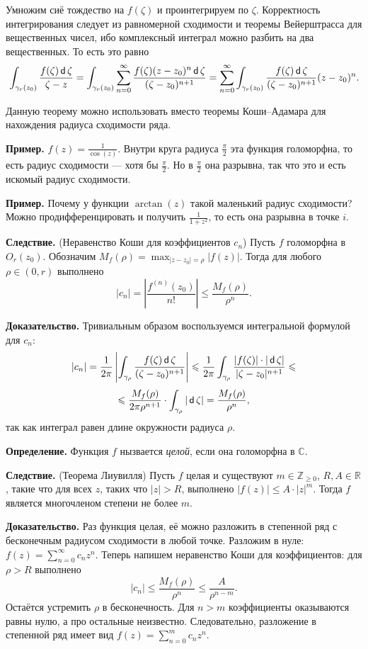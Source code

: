 Умножим сиё тождество на $f(\zeta)$ и проинтегрируем по $\zeta$.
Корректность интегрирования следует из равномерной сходимости и теоремы Вейерштрасса для вещественных чисел, ибо комплексный интеграл можно разбить на два вещественных.
То есть это равно
\[
    \int_{\gamma_r(z_0)} \frac{f(\zeta) \operatorname{\mathsf d} \zeta}{\zeta - z} = \int_{\gamma_r(z_0)} \sum_{n=0}^{\infty} \frac{f(\zeta) (z - z_0)^n \operatorname{\mathsf d} \zeta}{(\zeta - z_0)^{n+1}} = \sum_{n=0}^{\infty} \int_{\gamma_r(z_0)} \frac{f(\zeta) \operatorname{\mathsf d} \zeta}{(\zeta - z_0)^{n+1}} (z - z_0)^n.
\]

\QED

Данную теорему можно использовать вместо теоремы Коши--Адамара для нахождения радиуса сходимости ряда.

\textbf{Пример.} $f(z) = \frac{1}{\cos(z)}$.
Внутри круга радиуса $\frac{\pi}{2}$ эта функция голоморфна, то есть радиус сходимости --- хотя бы $\frac{\pi}{2}$.
Но в $\frac{\pi}{2}$ она разрывна, так что это и есть искомый радиус сходимости.

\textbf{Пример.} Почему у функции $\arctan(z)$ такой маленький радиус сходимости?
Можно продифференцировать и получить $\frac{1}{1 + z^2}$, то есть она разрывна в точке $i$.

\textbf{Следствие.} (Неравенство Коши для коэффициентов $c_n$) Пусть $f$ голоморфна в $O_r(z_0)$.
Обозначим $M_f(\rho) = \max_{|z - z_0| = \rho} |f(z)|$.
Тогда для любого $\rho \in (0, r)$ выполнено
\[
    |c_n| = \left| \frac{f^{(n)}(z_0)}{n!} \right| \le \frac{M_f(\rho)}{\rho^n}.
\]

\textbf{Доказательство.} Тривиальным образом воспользуемся интегральной формулой для $c_n$:
\[
    |c_n| = \frac{1}{2\pi} \left| \int_{\gamma_\rho} \frac{f(\zeta) \operatorname{\mathsf d} \zeta}{(\zeta - z_0)^{n+1}} \right| \leqslant \frac{1}{2\pi} \int_{\gamma_\rho} \frac{|f(\zeta)| \cdot |\operatorname{\mathsf d} \zeta|}{|\zeta - z_0|^{n+1}} \leqslant
\]
\[
    \leqslant \frac{M_f(\rho)}{2\pi \rho^{n+1}} \cdot \int_{\gamma_\rho} |\operatorname{\mathsf d} \zeta| = \frac{M_f(\rho)}{\rho^n},
\]
так как интеграл равен длине окружности радиуса $\rho$.

\QED

\textbf{Определение.} Функция $f$ нызвается \textit{целой}, если она голоморфна в $\mathbb C$.

\textbf{Следствие.} (Теорема Лиувилля) Пусть $f$ целая и существуют $m \in \mathbb Z_{\ge 0}$, $R, A \in \mathbb R$, такие что для всех $z$, таких что $|z| > R$, выполнено $|f(z)| \le A \cdot |z|^m$.
Тогда $f$ является многочленом степени не более $m$.

\textbf{Доказательство.} Раз функция целая, её можно разложить в степенной ряд с бесконечным радиусом сходимости в любой точке.
Разложим в нуле: $f(z) = \sum_{n=0}^{\infty} c_n z^n$.
Теперь напишем неравенство Коши для коэффициентов: для $\rho > R$ выполнено
\[
    |c_n| \le \frac{M_f(\rho)}{\rho^n} \le \frac{A}{\rho^{n-m}}.
\]
Остаётся устремить $\rho$ в бесконечность.
Для $n > m$ коэффициенты оказываются равны нулю, а про остальные неизвестно.
Следовательно, разложение в степенной ряд имеет вид $f(z) = \sum_{n=0}^{m} c_n z^n$.

